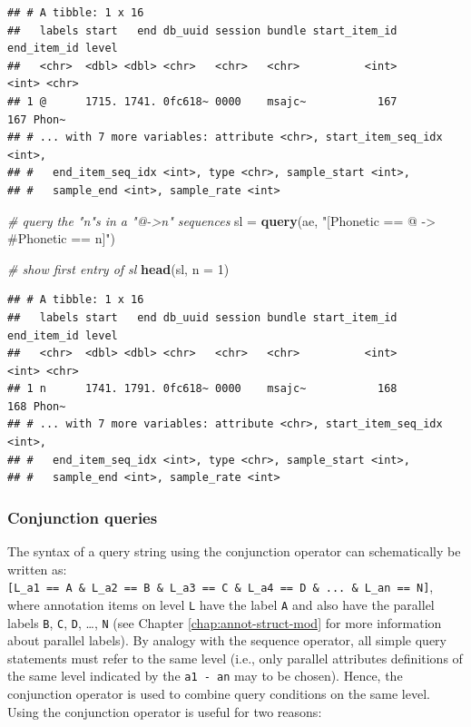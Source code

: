 \documentclass[]{book}
\newenvironment{Shaded}{\begin{snugshade}}{\end{snugshade}}
\newcommand{\CommentTok}[1]{\textcolor[rgb]{0.56,0.35,0.01}{\textit{#1}}}
\newcommand{\DataTypeTok}[1]{\textcolor[rgb]{0.13,0.29,0.53}{#1}}
\newcommand{\DecValTok}[1]{\textcolor[rgb]{0.00,0.00,0.81}{#1}}
\newcommand{\KeywordTok}[1]{\textcolor[rgb]{0.13,0.29,0.53}{\textbf{#1}}}
\newcommand{\NormalTok}[1]{#1}
\newcommand{\StringTok}[1]{\textcolor[rgb]{0.31,0.60,0.02}{#1}}
\begin{document}
\begin{verbatim}
## # A tibble: 1 x 16
##   labels start   end db_uuid session bundle start_item_id end_item_id level
##   <chr>  <dbl> <dbl> <chr>   <chr>   <chr>          <int>       <int> <chr>
## 1 @      1715. 1741. 0fc618~ 0000    msajc~           167         167 Phon~
## # ... with 7 more variables: attribute <chr>, start_item_seq_idx <int>,
## #   end_item_seq_idx <int>, type <chr>, sample_start <int>,
## #   sample_end <int>, sample_rate <int>
\end{verbatim}

\begin{Shaded}
\begin{Highlighting}[]
\CommentTok{# query the "n"s in a "@->n" sequences}
\NormalTok{sl =}\StringTok{ }\KeywordTok{query}\NormalTok{(ae, }\StringTok{"[Phonetic == @ -> #Phonetic == n]"}\NormalTok{)}

\CommentTok{# show first entry of sl}
\KeywordTok{head}\NormalTok{(sl, }\DataTypeTok{n =} \DecValTok{1}\NormalTok{)}
\end{Highlighting}
\end{Shaded}

\begin{verbatim}
## # A tibble: 1 x 16
##   labels start   end db_uuid session bundle start_item_id end_item_id level
##   <chr>  <dbl> <dbl> <chr>   <chr>   <chr>          <int>       <int> <chr>
## 1 n      1741. 1791. 0fc618~ 0000    msajc~           168         168 Phon~
## # ... with 7 more variables: attribute <chr>, start_item_seq_idx <int>,
## #   end_item_seq_idx <int>, type <chr>, sample_start <int>,
## #   sample_end <int>, sample_rate <int>
\end{verbatim}

\hypertarget{conjunction-queries}{%
\subsubsection{Conjunction queries}\label{conjunction-queries}}

The syntax of a query string using the conjunction operator can schematically be written as: \texttt{{[}L\_a1\ ==\ A\ \&\ L\_a2\ ==\ B\ \&\ L\_a3\ ==\ C\ \&\ L\_a4\ ==\ D\ \&\ ...\ \&\ L\_an\ ==\ N{]}}, where annotation items on level \texttt{L} have the label \texttt{A} and also have the parallel labels \texttt{B}, \texttt{C}, \texttt{D}, \ldots{}, \texttt{N} (see Chapter \ref{chap:annot-struct-mod} for more information about parallel labels). By analogy with the sequence operator, all simple query statements must refer to the same level (i.e., only parallel attributes definitions of the same level indicated by the \texttt{a1\ -\ an} may to be chosen). Hence, the conjunction operator is used to combine query conditions on the same level. Using the conjunction operator is useful for two reasons:
\end{document}
